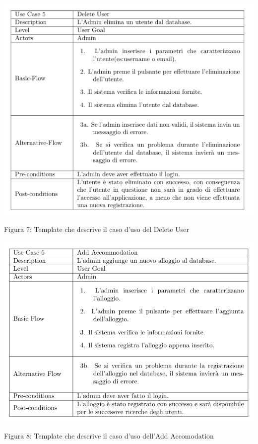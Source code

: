 \documentclass[10pt]{article}
\begin{document}
\begin{center}
\includegraphics[scale=0.7]{templates/tabella5}
\par\medskip
Figura 7: Template che descrive il caso d'uso del Delete User
\par\medskip
\includegraphics[scale=0.5]{templates/tabella6}
\par\medskip
Figura 8: Template che descrive il caso d'uso dell'Add Accomodation
\par\medskip
\end{center}
\end{document}
